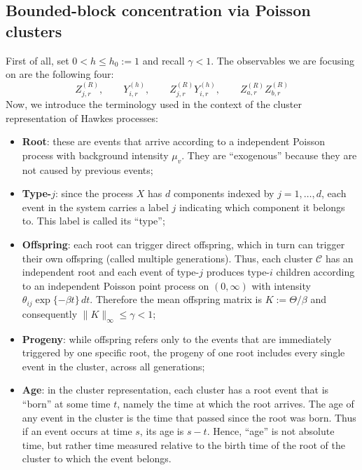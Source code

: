 \documentclass{article}
\begin{document}
\subsection{Bounded-block concentration via Poisson clusters}
\label{appendix:4}
First of all, set $0<h\le h_0:=1$ and recall $\gamma<1$. The observables we are focusing on are the following four:
\begin{equation}
    \label{eq:explicit-family}
    Z_{j,r}^{(R)},
    \qquad
    Y_{i,r}^{(h)},
    \qquad
    Z_{j,r}^{(R)}Y_{i,r}^{(h)},
    \qquad
Z_{a,r}^{(R)}Z_{b,r}^{(R)}
\end{equation}
Now, we introduce the terminology used in the context of the cluster representation of Hawkes processes:
\begin{itemize}
    \item\textbf{Root}: these are events that arrive according to a independent Poisson process with background intensity $\mu_v$. They are ``exogenous'' because they are not caused by previous events;
    \item\textbf{Type-$j$}: since the process $X$ has $d$ components indexed by $j=1,\dots, d$, each event in the system carries a label $j$ indicating which component it belongs to. This label is called its ``type'';
    \item \textbf{Offspring}: each root can trigger direct offspring, which in turn can trigger their own offspring (called multiple generations). Thus, each cluster $\mathcal C$ has an independent root and each event of type-$j$ produces type-$i$ children according to an independent Poisson point process on $(0,\infty)$ with intensity $\theta_{ij} \exp\{-\beta t\}\,dt$. Therefore the mean offspring matrix is $K:=\Theta/\beta$ and consequently $\|K\|_{\infty}\le \gamma < 1$;
    \item\textbf{Progeny}: while offspring refers only to the events that are immediately triggered by one specific root, the progeny of one root includes every single event in the cluster, across all generations;
    \item\textbf{Age}: in the cluster representation, each cluster has a root event that is ``born'' at some time $t$, namely the time at which the root arrives. The age of any event in the cluster is the time that passed since the root was born. Thus if an event occurs at time $s$, its age is $s - t$. Hence, ``age'' is not absolute time, but rather time measured relative to the birth time of the root of the cluster to which the event belongs.
\end{itemize}
\end{document}
